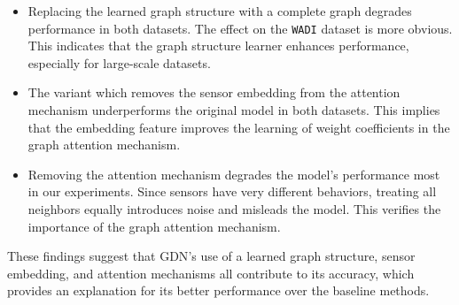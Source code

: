 \documentclass[letterpaper]{article} %
\begin{document}
\begin{itemize}
    \item Replacing the learned graph structure with a complete graph degrades performance in both datasets. The effect on the \texttt{WADI} dataset is more obvious. This indicates that the graph structure learner enhances performance, especially for large-scale datasets.
    \item The variant which removes the sensor embedding from the attention mechanism underperforms the original model in both datasets. This implies that the embedding feature improves the learning of weight coefficients in the graph attention mechanism.
    \item Removing the attention mechanism degrades the model's performance most in our experiments. Since sensors have very different behaviors, treating all neighbors equally introduces noise and misleads the model. This verifies the importance of the graph attention mechanism.
\end{itemize}
These findings suggest that \textsc{GDN}'s use of a learned graph structure, sensor embedding, and attention mechanisms all contribute to its accuracy, which provides an explanation for its better performance over the baseline methods.

\end{document}
